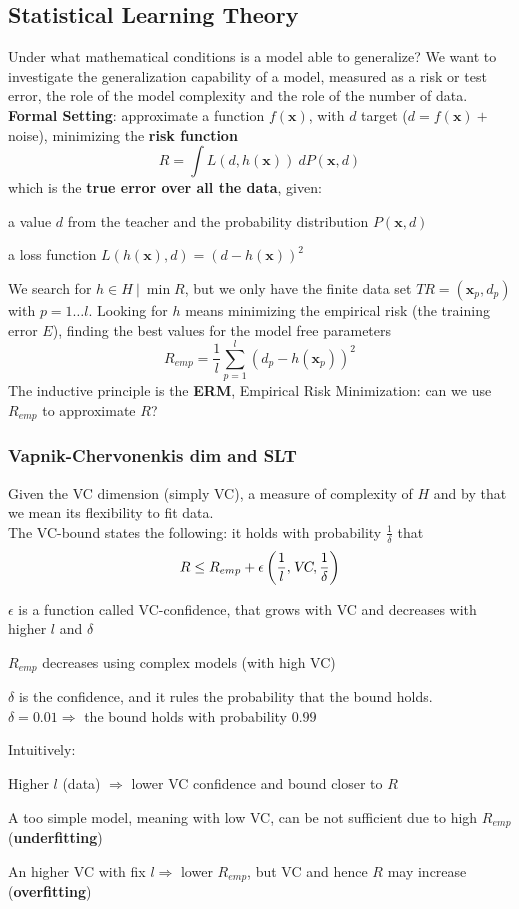 \documentclass[10pt]{report}
\begin{document}
\subsection{Statistical Learning Theory} Under what mathematical conditions is a model able to generalize? We want to investigate the generalization capability of a model, measured as a risk or test error, the role of the model complexity and the role of the number of data.\\
\textbf{Formal Setting}: approximate a function $f(\mathbf{x})$, with $d$ target ($d = f(\mathbf{x}) +$ noise), minimizing the \textbf{risk function} $$R = \int L(d, h(\mathbf{x}))\:dP(\mathbf{x},d)$$ which is the \textbf{true error over all the data}, given:
\begin{list}{}{}
	\item a value $d$ from the teacher and the probability distribution $P(\mathbf{x},d)$
	\item a loss function $L(h(\mathbf{x}),d) = (d - h(\mathbf{x}))^2$
\end{list}
We search for $h\in H\:|\: \min R$, but we only have the finite data set $TR = (\mathbf{x}_p, d_p)$ with $p = 1\ldots l$. Looking for $h$ means minimizing the empirical risk (the training error $E$), finding the best values for the model free parameters $$R_{emp} = \frac{1}{l}\sum_{p=1}^l (d_p - h(\mathbf{x}_p))^2$$
The inductive principle is the \textbf{ERM}, Empirical Risk Minimization: can we use $R_{emp}$ to approximate $R$?
\subsubsection{Vapnik-Chervonenkis dim and SLT} Given the VC dimension (simply VC), a measure of complexity of $H$ and by that we mean its flexibility to fit data.\\
The VC-bound states the following: it holds with probability $\frac{1}{\delta}$ that $$R \leq R_{emp} + \epsilon\left(\frac{1}{l}, \textsl{VC},\frac{1}{\delta}\right)$$
\begin{list}{}{}
	\item $\epsilon$ is a function called VC-confidence, that grows with VC and decreases with higher $l$ and $\delta$
	\item $R_{emp}$ decreases using complex models (with high VC)
	\item $\delta$ is the confidence, and it rules the probability that the bound holds.\\
	$\delta = 0.01 \Rightarrow$ the bound holds with probability $0.99$
\end{list}
Intuitively:
\begin{list}{}{}
	\item Higher $l$ (data) $\Rightarrow$ lower VC confidence and bound closer to $R$
	\item A too simple model, meaning with low VC, can be not sufficient due to high $R_{emp}$ (\textbf{underfitting})
	\item An higher VC with fix $l \Rightarrow$ lower $R_{emp}$, but VC and hence $R$ may increase (\textbf{overfitting})
\end{list}
\end{document}
